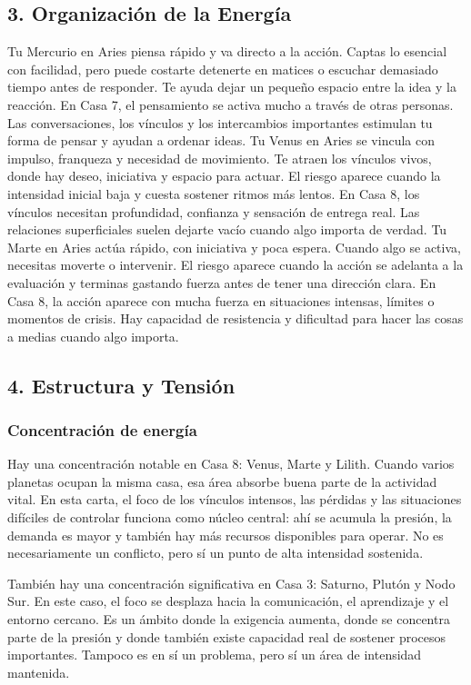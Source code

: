 \documentclass[11pt,a4paper]{article}\usepackage[utf8]{inputenc}
\begin{document}
\subsection{3. Organización de la Energía}

Tu Mercurio en Aries piensa rápido y va directo a la acción. Captas lo esencial con facilidad, pero puede costarte detenerte en matices o escuchar demasiado tiempo antes de responder. Te ayuda dejar un pequeño espacio entre la idea y la reacción. En Casa 7, el pensamiento se activa mucho a través de otras personas. Las conversaciones, los vínculos y los intercambios importantes estimulan tu forma de pensar y ayudan a ordenar ideas. Tu Venus en Aries se vincula con impulso, franqueza y necesidad de movimiento. Te atraen los vínculos vivos, donde hay deseo, iniciativa y espacio para actuar. El riesgo aparece cuando la intensidad inicial baja y cuesta sostener ritmos más lentos. En Casa 8, los vínculos necesitan profundidad, confianza y sensación de entrega real. Las relaciones superficiales suelen dejarte vacío cuando algo importa de verdad. Tu Marte en Aries actúa rápido, con iniciativa y poca espera. Cuando algo se activa, necesitas moverte o intervenir. El riesgo aparece cuando la acción se adelanta a la evaluación y terminas gastando fuerza antes de tener una dirección clara. En Casa 8, la acción aparece con mucha fuerza en situaciones intensas, límites o momentos de crisis. Hay capacidad de resistencia y dificultad para hacer las cosas a medias cuando algo importa.

\subsection{4. Estructura y Tensión}

\subsubsection*{Concentración de energía}

Hay una concentración notable en Casa 8: Venus, Marte y Lilith. Cuando varios planetas ocupan la misma casa, esa área absorbe buena parte de la actividad vital. En esta carta, el foco de los vínculos intensos, las pérdidas y las situaciones difíciles de controlar funciona como núcleo central: ahí se acumula la presión, la demanda es mayor y también hay más recursos disponibles para operar. No es necesariamente un conflicto, pero sí un punto de alta intensidad sostenida.

También hay una concentración significativa en Casa 3: Saturno, Plutón y Nodo Sur. En este caso, el foco se desplaza hacia la comunicación, el aprendizaje y el entorno cercano. Es un ámbito donde la exigencia aumenta, donde se concentra parte de la presión y donde también existe capacidad real de sostener procesos importantes. Tampoco es en sí un problema, pero sí un área de intensidad mantenida.
\end{document}
